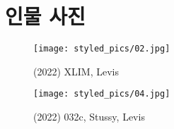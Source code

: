 \section*{인물 사진}

\begin{minipage}[h!]{0.5\textwidth}
    \begin{figure}[H]
        \texttt{[image: styled\_pics/02.jpg]}
        \caption*{(2022) XLIM, Levis}
    \end{figure}
\end{minipage}
\begin{minipage}[h!]{0.5\textwidth}
    \begin{figure}[H]
        \texttt{[image: styled\_pics/04.jpg]}
        \caption*{(2022) 032c, Stussy, Levis}
    \end{figure}
\end{minipage}

